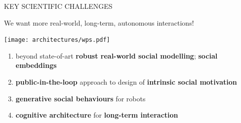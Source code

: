 \documentclass[xcolor=table]{beamer}
\begin{document}
%
%
%
%
%
%
%

\begin{frame}{KEY SCIENTIFIC CHALLENGES}

    \begin{center}
    We want more real-world, long-term, autonomous interactions!

        \texttt{[image: architectures/wps.pdf]}
    \end{center}

    \begin{enumerate}
            \scriptsize
        \item beyond state-of-art \textbf{robust real-world social modelling}; \textbf{social embeddings}
        \item \textbf{public-in-the-loop} approach to design of \textbf{intrinsic social motivation}
        \item \textbf{generative social behaviours} for robots
        \item \textbf{cognitive architecture} for \textbf{long-term interaction}
    \end{enumerate}

\end{frame}
\end{document}

